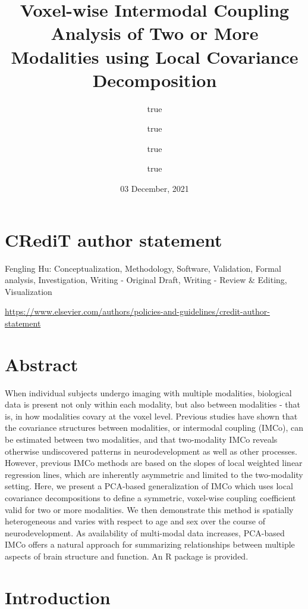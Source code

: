 \documentclass[
  12pt,
]{article}
\title{Voxel-wise Intermodal Coupling Analysis of Two or More Modalities using Local Covariance Decomposition}
\author{true \and true \and true \and true}
\date{03 December, 2021}
\begin{document}
\maketitle

{
\setcounter{tocdepth}{2}
\tableofcontents
}
\hypertarget{credit-author-statement}{%
\section{CRediT author statement}\label{credit-author-statement}}

Fengling Hu: Conceptualization, Methodology, Software, Validation, Formal analysis, Investigation, Writing - Original Draft, Writing - Review \& Editing, Visualization

\url{https://www.elsevier.com/authors/policies-and-guidelines/credit-author-statement}

\hypertarget{abstract}{%
\section{Abstract}\label{abstract}}

When individual subjects undergo imaging with multiple modalities, biological data is present not only within each modality, but also between modalities - that is, in how modalities covary at the voxel level. Previous studies have shown that the covariance structures between modalities, or intermodal coupling (IMCo), can be estimated between two modalities, and that two-modality IMCo reveals otherwise undiscovered patterns in neurodevelopment as well as other processes. However, previous IMCo methods are based on the slopes of local weighted linear regression lines, which are inherently asymmetric and limited to the two-modality setting. Here, we present a PCA-based generalization of IMCo which uses local covariance decompositions to define a symmetric, voxel-wise coupling coefficient valid for two or more modalities. We then demonstrate this method is spatially heterogeneous and varies with respect to age and sex over the course of neurodevelopment. As availability of multi-modal data increases, PCA-based IMCo offers a natural approach for summarizing relationships between multiple aspects of brain structure and function. An R package is provided.

\hypertarget{introduction}{%
\section{Introduction}\label{introduction}}
\end{document}
